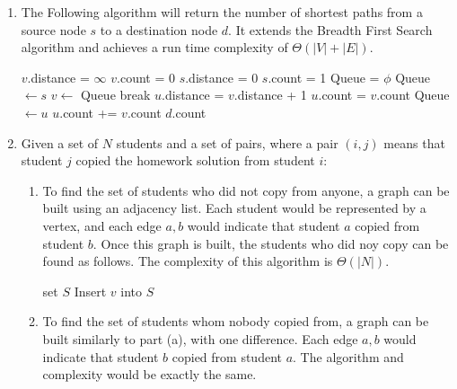 \documentclass[fleqn]{article}
\begin{document}
\begin{enumerate}
	\item %
	The Following algorithm will return the number of shortest paths from a source node \(s\) to a destination node \(d\). It extends the Breadth First Search algorithm and achieves a run time complexity of \(\Theta(|V| + |E|)\).
	\begin{algorithmic}[1]
				\State \(v\).distance = \(\infty\)
				\State \(v\).count = 0
			\EndFor
			\State \(s\).distance = 0
			\State \(s\).count = 1
			\State Queue = \(\phi\)
			\State Queue \(\leftarrow s\)
				\State \(v \leftarrow\) Queue
					\State break
				\EndIf
						\State \(u\).distance = \(v\).distance + 1
						\State \(u\).count = \(v\).count
						\State Queue \(\leftarrow u\)
						\State \(u\).count += \(v\).count
					\EndIf
				\EndFor
			\EndWhile
			\State \Return \(d\).count
		\EndFunction
	\end{algorithmic}

	\item %
	Given a set of \(N\) students and a set of pairs, where a pair \((i,j)\) means that student \(j\) copied the homework solution from student \(i\):
	\begin{enumerate}
		\item %
		To find the set of students who did not copy from anyone, a graph can be built using an adjacency list. Each student would be represented by a vertex, and each edge \(a, b\) would indicate that student \(a\) copied from student \(b\). Once this graph is built, the students who did noy copy can be found as follows. The complexity of this algorithm is \(\Theta(|N|)\).
		\begin{algorithmic}[1]
			\State set \(S\) 
					\State Insert \(v\) into \(S\)
				\EndIf
			\EndFor
		\end{algorithmic}

		\item %
		To find the set of students whom nobody copied from, a graph can be built similarly to part (a), with one difference. Each edge \(a, b\) would indicate that student \(b\) copied from student \(a\). The algorithm and complexity would be exactly the same.


\end{enumerate}
\end{enumerate}
\end{document}
